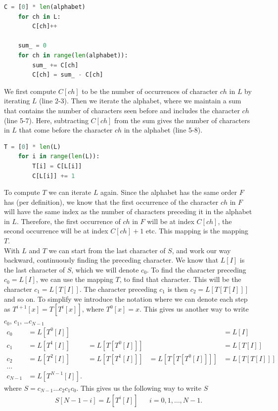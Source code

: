 \documentclass{article}
\begin{document}
\begin{lstlisting}[language=Python]
    C = [0] * len(alphabet)
    for ch in L:
        C[ch]++
        
    sum_ = 0
    for ch in range(len(alphabet)):
        sum_ += C[ch]
        C[ch] = sum_ - C[ch]
\end{lstlisting}
We first compute \(C[ch]\) to be the number of occurrences of character \(ch\) in \(L\) by iterating \(L\) (line 2-3). Then we iterate the alphabet, where we maintain a sum that contains the number of characters seen before and includes the character \(ch\) (line 5-7). Here, subtracting \(C[ch]\) from the sum gives the number of characters in \(L\) that come before the character \(ch\) in the alphabet (line 5-8).
\begin{lstlisting}[language=Python]
    T = [0] * len(L)
    for i in range(len(L)):
        T[i] = C[L[i]]
        C[L[i]] += 1
\end{lstlisting}
To compute \(T\) we can iterate \(L\) again. Since the alphabet has the same order \(F\) has (per definition), we know that the first occurrence of the character \(ch\) in \(F\) will have the same index as the number of characters preceding it in the alphabet in \(L\). Therefore, the first occurrence of \(ch\) in \(F\) will be at index \(C[ch]\), the second occurrence will be at index \(C[ch] + 1\) etc. This mapping is the mapping \(T\).
\\

With \(L\) and \(T\) we can start from the last character of \(S\), and work our way backward, continuously finding the preceding character. 
We know that \(L[I]\) is the last character of \(S\), which we will denote \(c_0\). To find the character preceding \(c_0 = L[I]\), we can use the mapping \(T\), to find that character. This will be the character \(c_1 = L[T[I]]\). The character preceding \(c_1\) is then \(c_2 = L[T[T[I]]]\) and so on. To simplify we introduce the notation where we can denote each step as \(T^{i+1}[x]=T[T^{i}[x]]\), where \(T^0[x] = x\). This gives us another way to write \(c_0\), \(c_1\), \dots \(c_{N-1}\)
\begin{align*}
    c_0 &= L[T^{0}[I]] & & &= L[I]  \\
    c_1 &= L[T^{1}[I]] &= L[T[T^{0}[I]]] & &= L[T[I]] \\
    c_2 &= L[T^{2}[I]] &= L[T[T^{1}[I]]] &= L[T[T[T^{0}[I]]]] &= L[T[T[I]]] \\
    \dots \\
    c_{N-1} &= L[T^{N-1}[I]].
\end{align*}
where \(S = c_{N-1} \dots c_2 c_1 c_0\). This gives us the following way to write \(S\)
\begin{align*}
    S[N - 1 - i] = L[T^{i}[I]] && i=0,1,\dots , N - 1.
\end{align*}
\end{document}
